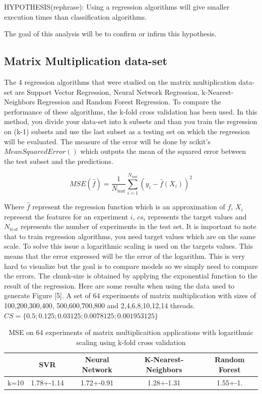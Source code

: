  HYPOTHESIS(rephrase): Using a regression algorithms will give smaller execution times than classification algorithms.
 
  The goal of this analysis will be to confirm or infirm this hypothesis.


\subsection{Matrix Multiplication data-set}

The 4 regression algorithms that were studied on the matrix multiplication data-set are Support Vector Regression, Neural Network Regression, k-Nearest-Neighbors Regression and Random Forest Regression. To compare the performance of these algorithms, the k-fold cross validation has been used. In this method, you divide your data-set into k subsets and than you train the regression on (k-1) subsets and use the last subset as a testing set on which the regression will be evaluated. The measure of the error will be done by scikit's $MeanSquaredError()$ which outputs the mean of the squared error between the test subset and the predictions.

$$MSE(\hat{f})=\frac{1}{N_\text{test}}\sum_{i=1}^{N_\text{test}}(y_i-\hat{f}(X_i))^2$$

Where $\hat{f}$ represent the regression function which is an approximation of $f$, $X_i$ represent the features for an experiment $i$, $cs_i$ represents the target values and $N_{test}$ represents the number of experiments in the test set. It is important to note that to train regression algorithms, you need target values which are on the same scale. To solve this issue a logarithmic scaling is used on the targets values. This means that the error expressed will be the error of the logarithm. This is very hard to visualize but the goal is to compare models so we simply need to compare the errors. The chunk-size is obtained by applying the exponential function to the result of the regression.
Here are some results when using the data used to generate  Figure [5]. A set of 64 experiments of matrix multiplication with sizes of 100,200,300,400, 500,600,700,800 and 2,4,6,8,10,12,14 threads.$CS=\{0.5;0.125;0.03125;0.0078125;0.001953125\}$

\begin{table}[h]
	\centering
	\caption{MSE on 64 experiments of matrix multiplicaition applications with logarithmic scaling using k-fold cross validation}
	\label{my-label}
	\begin{tabular}{|c|c|c|c|c|}
		\hline
		& SVR           & Neural Network & K-Nearest-Neighbors & Random Forest \\ \hline
		k=10 & 1.78+-1.14  & 1.72+-0.91    & 1.28+-1.31        & 1.55+-1. \\ \hline
	\end{tabular}
\end{table}

